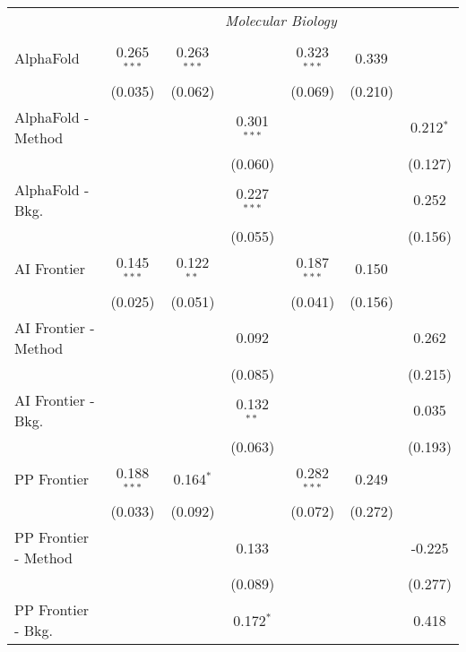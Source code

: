 \begin{tabular}{lcccccc}
 & \multicolumn{6}{c}{\textit{Molecular Biology}} \\ \\
   AlphaFold            & 0.265$^{***}$ & 0.263$^{***}$ &               & 0.323$^{***}$ & 0.339   &   \\   
                        & (0.035)       & (0.062)       &               & (0.069)       & (0.210) &   \\   
   AlphaFold - Method   &               &               & 0.301$^{***}$ &               &         & 0.212$^{*}$\\   
                        &               &               & (0.060)       &               &         & (0.127)\\   
   AlphaFold - Bkg.     &               &               & 0.227$^{***}$ &               &         & 0.252\\   
                        &               &               & (0.055)       &               &         & (0.156)\\   
   AI Frontier          & 0.145$^{***}$ & 0.122$^{**}$  &               & 0.187$^{***}$ & 0.150   &   \\   
                        & (0.025)       & (0.051)       &               & (0.041)       & (0.156) &   \\   
   AI Frontier - Method &               &               & 0.092         &               &         & 0.262\\   
                        &               &               & (0.085)       &               &         & (0.215)\\   
   AI Frontier - Bkg.   &               &               & 0.132$^{**}$  &               &         & 0.035\\   
                        &               &               & (0.063)       &               &         & (0.193)\\   
   PP Frontier          & 0.188$^{***}$ & 0.164$^{*}$   &               & 0.282$^{***}$ & 0.249   &   \\   
                        & (0.033)       & (0.092)       &               & (0.072)       & (0.272) &   \\   
   PP Frontier - Method &               &               & 0.133         &               &         & -0.225\\   
                        &               &               & (0.089)       &               &         & (0.277)\\   
   PP Frontier - Bkg.   &               &               & 0.172$^{*}$   &               &         & 0.418\\   

\end{tabular}

